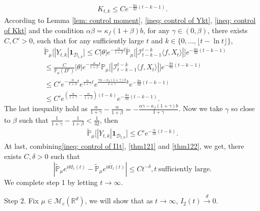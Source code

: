 \documentclass[12pt,oneside,english]{amsart}
\theoremstyle{plain}
\theoremstyle{definition}
\numberwithin{equation}{section}
\begin{document}
\begin{align}\label{ineq: control of Kkt}
     K_{t,k}\leq C e^{-\frac{3\alpha}{32}(t-k-1)}.
\end{align}
 According to Lemma \ref{lem: control moment}, \eqref{ineq: control of Ykt}, \eqref{ineq: control of Kkt} and the condition $\alpha\beta=\kappa_f(1+\beta)b$, for any $\gamma\in (0, \beta)$, there exists $C,C'>0$, such that for any  sufficiently large  $t$ and $k\in \{0,...,\lfloor t-\ln t\rfloor\}$,
\begin{align}
    &\mathbb{\tilde{P}}_{\mu}\big[|Y_{t,k}|\mathbf{1}_{\mathcal{D}_{t,k}}\big]
    \leq C|\theta|e^{-\frac{\alpha}{1+\beta}t}\mathbb{\tilde{P}}_{\mu}\big[|\mathcal{I}_{t-k-1}^{t-k}\langle f,X_t\rangle|\big]e^{-\frac{3\alpha}{32}(t-k-1)}
    \\&\leq \frac{C}{\mathbb{P}_{\mu}(D^c)}|\theta|e^{-\frac{\alpha}{1+\beta}t}\mathbb{P}_{\mu}\big[|\mathcal{I}_{t-k-1}^{t-k}\langle f,X_t\rangle|\big]e^{-\frac{3\alpha}{32}(t-k-1)}
    \\&\leq C' e^{-\frac{\alpha}{1+\beta}t}e^{\frac{\alpha}{1+\gamma}t}e^{\frac{\gamma \alpha-\kappa_f(1+\gamma)b}{1+\gamma}k}e^{-\frac{3\alpha}{32}(t-k-1)}\label{thm125}\\
    &\leq C' e^{(\frac{\alpha}{1+\gamma}-\frac{\alpha}{1+\beta})(t-k)}e^{-\frac{3\alpha}{32}(t-k-1)}.\nonumber
\end{align}
The last inequality hold as $\frac{\alpha}{1+\gamma}-\frac{\alpha}{1+\beta}=-\frac{\alpha \gamma-\kappa
_f(1+\gamma)b}{1+\gamma}$.
Now we take $\gamma$ so close to $\beta$ such that $\frac{1}{1+\gamma}-\frac{1}{1+\beta}<\frac{1}{32}$, then
\begin{align}
     \mathbb{\tilde{P}}_{\mu}\big[|Y_{t,k}|\mathbf{1}_{\mathcal{D}_{t,k}}\big]\leq  C' e^{-\frac{\alpha}{16}(t-k)}.\label{thm122}
\end{align}
At last, combining\eqref{ineq: control of I1t}, \eqref{thm121} and \eqref{thm122}, we get, there exists $C,\delta>0$ such that
$$\left|\mathbb{\tilde{P}}_{\mu}e^{i\theta I_1(t)}-\mathbb{\tilde{P}}_{\mu}e^{i\theta\tilde{I}_1(t)}\right|\leq C t^{-\delta}, t ~\text{sufficiently large}.$$
We complete step 1 by letting $t\rightarrow \infty$.

Step 2. Fix $\mu \in \mathcal{M}_c(\mathbb{R}^d)$, we will show that as $t\rightarrow \infty$, $I_2(t) \xrightarrow{d} 0$.
\end{document}
